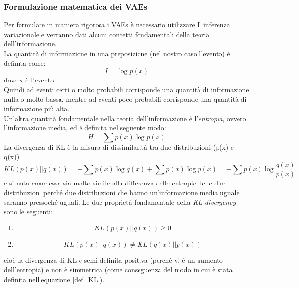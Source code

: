 \newpage

\subsubsection{Formulazione matematica dei VAEs}
\label{matematica dei VAEs}

Per formulare in maniera rigorosa i VAEs è necessario utilizzare l' inferenza variazionale e verranno dati alcuni concetti fondamentali della teoria dell'informazione. \\
La quantità di informazione in una preposizione (nel nostro caso l'evento) è definita come:
\begin{equation}
	I = \log p(x)
\end{equation}
dove x è l'evento. \\
Quindi ad eventi certi o molto probabili corrisponde una quantità di informazione nulla o molto bassa, mentre ad eventi poco probabili corrisponde una quantità di informazione più alta. \\ 
Un'altra quantità fondamentale nella teoria dell'informazione è l'\textit{entropia}, ovvero l'informazione media, ed è definita nel seguente modo:
\begin{equation}
	H = \sum p(x) \log p(x)
\end{equation}
La divergenza di KL è la misura di dissimilarità tra due distribuzioni (p(x) e q(x)):
\begin{equation}
	KL(p(x)||q(x)) = -\sum p(x) \log q(x) + \sum p(x) \log p(x) = -\sum p(x) \log \frac{q(x)}{p(x)}
	\label{def_KL}
\end{equation}
e si nota come essa sia molto simile alla differenza delle entropie delle due distribuzioni perché due distribuzioni che hanno un'informazione media uguale saranno pressoché uguali.
Le due proprietà fondamentale della \textit{KL divergency} sono le seguenti:
\begin{enumerate}
	\item 
	\begin{equation}
		KL(p(x)||q(x)) \geq 0
	\end{equation}
	
	\item 
	\begin{equation}
		KL(p(x)||q(x)) \not = KL(q(x)||p(x))
	\end{equation}
\end{enumerate}
cioè la divergenza di KL è semi-definita positiva (perché vi è un aumento dell'entropia) e non è simmetrica (come conseguenza del modo in cui è stata definita nell'equazione \ref{def_KL}). \\
